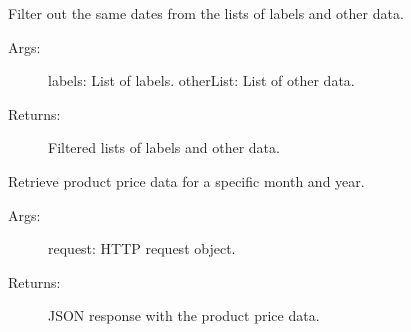 \documentclass[letterpaper,10pt,english]{sphinxmanual}
\begin{document}

\begin{fulllineitems}
\label{\detokenize{modules/views:Inventory.views.FilterSameDates}}
\sphinxAtStartPar
Filter out the same dates from the lists of labels and other data.
\begin{description}
\item[{Args:}] \leavevmode
\sphinxAtStartPar
labels: List of labels.
otherList: List of other data.

\item[{Returns:}] \leavevmode
\sphinxAtStartPar
Filtered lists of labels and other data.

\end{description}

\end{fulllineitems}


\begin{fulllineitems}
\label{\detokenize{modules/views:Inventory.views.GetProductPriceData}}
\sphinxAtStartPar
Retrieve product price data for a specific month and year.
\begin{description}
\item[{Args:}] \leavevmode
\sphinxAtStartPar
request: HTTP request object.

\item[{Returns:}] \leavevmode
\sphinxAtStartPar
JSON response with the product price data.

\end{description}

\end{fulllineitems}

\end{document}
